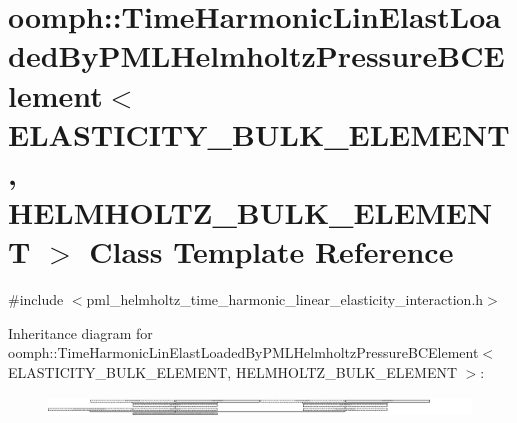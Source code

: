 \hypertarget{classoomph_1_1TimeHarmonicLinElastLoadedByPMLHelmholtzPressureBCElement}{}\section{oomph\+:\+:Time\+Harmonic\+Lin\+Elast\+Loaded\+By\+P\+M\+L\+Helmholtz\+Pressure\+B\+C\+Element$<$ E\+L\+A\+S\+T\+I\+C\+I\+T\+Y\+\_\+\+B\+U\+L\+K\+\_\+\+E\+L\+E\+M\+E\+NT, H\+E\+L\+M\+H\+O\+L\+T\+Z\+\_\+\+B\+U\+L\+K\+\_\+\+E\+L\+E\+M\+E\+NT $>$ Class Template Reference}
\label{classoomph_1_1TimeHarmonicLinElastLoadedByPMLHelmholtzPressureBCElement}


{\ttfamily \#include $<$pml\+\_\+helmholtz\+\_\+time\+\_\+harmonic\+\_\+linear\+\_\+elasticity\+\_\+interaction.\+h$>$}

Inheritance diagram for oomph\+:\+:Time\+Harmonic\+Lin\+Elast\+Loaded\+By\+P\+M\+L\+Helmholtz\+Pressure\+B\+C\+Element$<$ E\+L\+A\+S\+T\+I\+C\+I\+T\+Y\+\_\+\+B\+U\+L\+K\+\_\+\+E\+L\+E\+M\+E\+NT, H\+E\+L\+M\+H\+O\+L\+T\+Z\+\_\+\+B\+U\+L\+K\+\_\+\+E\+L\+E\+M\+E\+NT $>$\+:\begin{figure}[H]
\begin{center}
\leavevmode
\includegraphics[height=0.545012cm]{classoomph_1_1TimeHarmonicLinElastLoadedByPMLHelmholtzPressureBCElement}
\end{center}
\end{figure}
